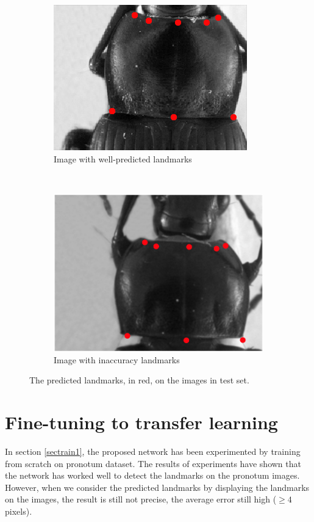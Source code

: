 \documentclass[10pt]{article}
\begin{document}
\begin{figure}[htbp]
    \centering
    \begin{subfigure}[t]{0.25\textwidth}
        \centering
        \includegraphics[scale=1.5]{images/fn_accuracy}
        \caption{\small{Image with well-predicted landmarks}}
        \label{figsub1}
    \end{subfigure}%
    ~ 
    \begin{subfigure}[t]{0.25\textwidth}
        \centering
        \includegraphics[scale=.65]{images/plandmark2}
        \caption{\small{Image with inaccuracy landmarks}}
        \label{figsub2}
    \end{subfigure}
    \caption{\small{The predicted landmarks, in red,  on the images in test set.}}
    \label{figrsexample}
\end{figure}

\section{Fine-tuning to transfer learning}
\label{secimproving}
In section \ref{sectrain1}, the proposed network has been experimented
by training from scratch on pronotum dataset. The results of
experiments have shown that the network has worked well to detect the
landmarks on the pronotum images. However, when we consider the
predicted landmarks by displaying the landmarks on the images, the
result is still not precise, the average error still high ($\geq 4$
pixels).
\end{document}
